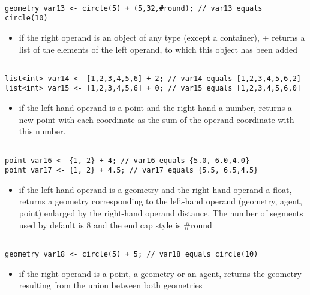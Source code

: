 \documentclass[]{book}
\providecommand{\tightlist}{%
  \setlength{\itemsep}{0pt}\setlength{\parskip}{0pt}}
\theoremstyle{definition}
\theoremstyle{definition}
\theoremstyle{definition}
\theoremstyle{remark}
\begin{document}
\begin{verbatim}
 
geometry var13 <- circle(5) + (5,32,#round); // var13 equals circle(10)
\end{verbatim}

\begin{itemize}
\tightlist
\item
  if the right operand is an object of any type (except a container), +
  returns a list of the elements of the left operand, to which this
  object has been added
\end{itemize}

\begin{verbatim}
 
list<int> var14 <- [1,2,3,4,5,6] + 2; // var14 equals [1,2,3,4,5,6,2] 
list<int> var15 <- [1,2,3,4,5,6] + 0; // var15 equals [1,2,3,4,5,6,0]
\end{verbatim}

\begin{itemize}
\tightlist
\item
  if the left-hand operand is a point and the right-hand a number,
  returns a new point with each coordinate as the sum of the operand
  coordinate with this number.
\end{itemize}

\begin{verbatim}
 
point var16 <- {1, 2} + 4; // var16 equals {5.0, 6.0,4.0} 
point var17 <- {1, 2} + 4.5; // var17 equals {5.5, 6.5,4.5}
\end{verbatim}

\begin{itemize}
\tightlist
\item
  if the left-hand operand is a geometry and the right-hand operand a
  float, returns a geometry corresponding to the left-hand operand
  (geometry, agent, point) enlarged by the right-hand operand distance.
  The number of segments used by default is 8 and the end cap style is
  \#round
\end{itemize}

\begin{verbatim}
 
geometry var18 <- circle(5) + 5; // var18 equals circle(10)
\end{verbatim}

\begin{itemize}
\tightlist
\item
  if the right-operand is a point, a geometry or an agent, returns the
  geometry resulting from the union between both geometries
\end{itemize}
\end{document}
